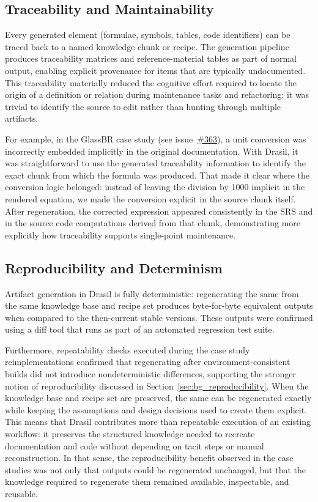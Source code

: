 \subsection{Traceability and Maintainability}
\label{sec:res_traceability}
Every generated element (formulae, symbols, tables, code identifiers) can be
traced back to a named knowledge chunk or recipe. The generation pipeline
produces traceability matrices and reference-material tables as part of normal
output, enabling explicit provenance for items that are typically
undocumented. This traceability materially reduced the cognitive effort
required to locate the origin of a definition or relation during maintenance
tasks and refactoring: it was trivial to identify the source to edit rather than
hunting through multiple artifacts.

For example, in the GlassBR case study (see 
issue~\href{https://github.com/JacquesCarette/Drasil/issues/363}{\#363}), a 
unit conversion was incorrectly embedded implicitly in the original 
documentation. With 
Drasil, it was straightforward to use the generated traceability information to 
identify the exact chunk from which the formula was produced. That made it 
clear where the conversion logic belonged: instead of leaving the division by 
1000 implicit in the rendered equation, we made the conversion explicit in the 
source chunk itself. After regeneration, the corrected expression appeared 
consistently in the SRS and in the source code computations derived from that 
chunk, demonstrating more explicitly how traceability supports single-point
maintenance.

\subsection{Reproducibility and Determinism}
Artifact generation in Drasil is fully deterministic: regenerating the same
\sfs{} from the same knowledge base and recipe set produces
byte-for-byte equivalent outputs when compared to the then-current stable 
versions. These outputs were confirmed using a diff tool that runs as part of an 
automated regression test suite.

Furthermore, repeatability checks executed during the case study 
reimplementations confirmed that regenerating \sfs{} after 
environment-consistent builds did not introduce nondeterministic differences, 
supporting the stronger notion of reproducibility discussed in
Section~\ref{sec:bg_reproducibility}. When the knowledge base and recipe set
are preserved, the same \sfs{} can be regenerated exactly while keeping the
assumptions and design decisions used to create them explicit. This means that
Drasil contributes more than repeatable execution of an existing workflow: it
preserves the structured knowledge needed to recreate documentation and code
without depending on tacit steps or manual reconstruction. In that sense, the
reproducibility benefit observed in the case studies was not only that outputs
could be regenerated unchanged, but that the knowledge required to regenerate
them remained available, inspectable, and reusable.

